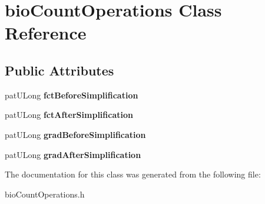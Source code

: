 \hypertarget{classbio_count_operations}{}\section{bio\+Count\+Operations Class Reference}
\label{classbio_count_operations}
\subsection*{Public Attributes}
\begin{DoxyCompactItemize}
\item 
\mbox{\label{classbio_count_operations_a9cb6f8cb108249950d9ae27c91df4e4c}} 
pat\+U\+Long {\bfseries fct\+Before\+Simplification}
\item 
\mbox{\label{classbio_count_operations_af3843623d0db11847e28769670a217e5}} 
pat\+U\+Long {\bfseries fct\+After\+Simplification}
\item 
\mbox{\label{classbio_count_operations_adc5cda79ef168066d507f3929e23f6e1}} 
pat\+U\+Long {\bfseries grad\+Before\+Simplification}
\item 
\mbox{\label{classbio_count_operations_a57fa7df8fa86125f76781a72f03cc827}} 
pat\+U\+Long {\bfseries grad\+After\+Simplification}
\end{DoxyCompactItemize}


The documentation for this class was generated from the following file\+:\begin{DoxyCompactItemize}
\item 
bio\+Count\+Operations.\+h\end{DoxyCompactItemize}
